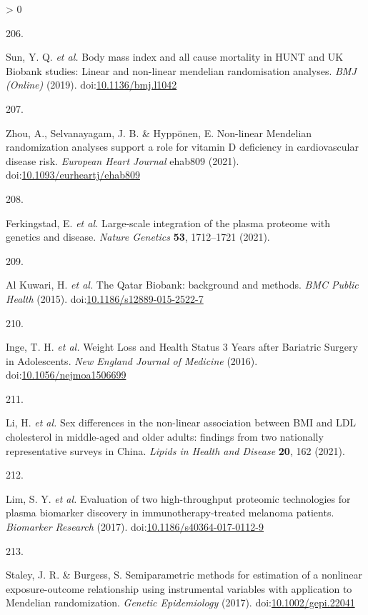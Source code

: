 \documentclass[11pt,twoside]{bristolthesis}
\newlength{\cslhangindent}
\newlength{\csllabelwidth}
\newenvironment{CSLReferences}[2] %
 {%
  \setlength{\parindent}{0pt}
  \ifodd #1 \everypar{\setlength{\hangindent}{\cslhangindent}}\ignorespaces\fi
  \ifnum #2 > 0
  \setlength{\parskip}{#2\baselineskip}
  \fi
 }%
 {}
\newcommand{\CSLLeftMargin}[1]{\parbox[t]{\csllabelwidth}{#1}}
\newcommand{\CSLRightInline}[1]{\parbox[t]{\linewidth - \csllabelwidth}{#1}\break}
\begin{document}
\begin{CSLReferences}{0}{0}
\leavevmode\hypertarget{ref-Sun2019}{}%
\CSLLeftMargin{206. }
\CSLRightInline{Sun, Y. Q. \emph{et al.} {Body mass index and all cause mortality in HUNT and UK Biobank studies: Linear and non-linear mendelian randomisation analyses}. \emph{BMJ (Online)} (2019). doi:\href{https://doi.org/10.1136/bmj.l1042}{10.1136/bmj.l1042}}

\leavevmode\hypertarget{ref-Zhou2021}{}%
\CSLLeftMargin{207. }
\CSLRightInline{Zhou, A., Selvanayagam, J. B. \& Hyppönen, E. {Non-linear Mendelian randomization analyses support a role for vitamin D deficiency in cardiovascular disease risk}. \emph{European Heart Journal} ehab809 (2021). doi:\href{https://doi.org/10.1093/eurheartj/ehab809}{10.1093/eurheartj/ehab809}}

\leavevmode\hypertarget{ref-Ferkingstad2021}{}%
\CSLLeftMargin{208. }
\CSLRightInline{Ferkingstad, E. \emph{et al.} {Large-scale integration of the plasma proteome with genetics and disease}. \emph{Nature Genetics} \textbf{53}, 1712--1721 (2021).}

\leavevmode\hypertarget{ref-AlKuwari2015}{}%
\CSLLeftMargin{209. }
\CSLRightInline{Al Kuwari, H. \emph{et al.} {The Qatar Biobank: background and methods}. \emph{BMC Public Health} (2015). doi:\href{https://doi.org/10.1186/s12889-015-2522-7}{10.1186/s12889-015-2522-7}}

\leavevmode\hypertarget{ref-Inge2016}{}%
\CSLLeftMargin{210. }
\CSLRightInline{Inge, T. H. \emph{et al.} {Weight Loss and Health Status 3 Years after Bariatric Surgery in Adolescents}. \emph{New England Journal of Medicine} (2016). doi:\href{https://doi.org/10.1056/nejmoa1506699}{10.1056/nejmoa1506699}}

\leavevmode\hypertarget{ref-Li2021}{}%
\CSLLeftMargin{211. }
\CSLRightInline{Li, H. \emph{et al.} {Sex differences in the non-linear association between BMI and LDL cholesterol in middle-aged and older adults: findings from two nationally representative surveys in China}. \emph{Lipids in Health and Disease} \textbf{20}, 162 (2021).}

\leavevmode\hypertarget{ref-Lim2017}{}%
\CSLLeftMargin{212. }
\CSLRightInline{Lim, S. Y. \emph{et al.} {Evaluation of two high-throughput proteomic technologies for plasma biomarker discovery in immunotherapy-treated melanoma patients}. \emph{Biomarker Research} (2017). doi:\href{https://doi.org/10.1186/s40364-017-0112-9}{10.1186/s40364-017-0112-9}}

\leavevmode\hypertarget{ref-Staley2017}{}%
\CSLLeftMargin{213. }
\CSLRightInline{Staley, J. R. \& Burgess, S. {Semiparametric methods for estimation of a nonlinear exposure-outcome relationship using instrumental variables with application to Mendelian randomization}. \emph{Genetic Epidemiology} (2017). doi:\href{https://doi.org/10.1002/gepi.22041}{10.1002/gepi.22041}}

\end{CSLReferences}
\end{document}
